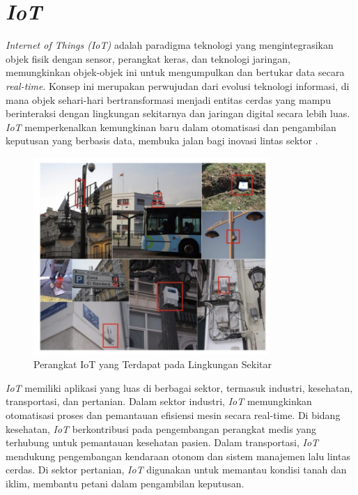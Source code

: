 \section{\textit{IoT}}

\textit{Internet of Things (IoT)} adalah paradigma teknologi yang mengintegrasikan objek fisik dengan sensor, perangkat keras, dan teknologi jaringan, memungkinkan objek-objek ini untuk mengumpulkan dan bertukar data secara \textit{real-time}. Konsep ini merupakan perwujudan dari evolusi teknologi informasi, di mana objek sehari-hari bertransformasi menjadi entitas cerdas yang mampu berinteraksi dengan lingkungan sekitarnya dan jaringan digital secara lebih luas. \textit{IoT} memperkenalkan kemungkinan baru dalam otomatisasi dan pengambilan keputusan yang berbasis data, membuka jalan bagi inovasi lintas sektor \parencite{madakam2015internet}.

\begin{figure}[ht]
  \centering
  \includegraphics[width=0.8\textwidth]{resources/chapter-2/gambar-iot.jpg}
  \caption{Perangkat IoT yang Terdapat pada Lingkungan Sekitar \parencite{sotres2017practical}}
\end{figure}

\textit{IoT} memiliki aplikasi yang luas di berbagai sektor, termasuk industri, kesehatan, transportasi, dan pertanian. Dalam sektor industri, \textit{IoT} memungkinkan otomatisasi proses dan pemantauan efisiensi mesin secara real-time. Di bidang kesehatan, \textit{IoT} berkontribusi pada pengembangan perangkat medis yang terhubung untuk pemantauan kesehatan pasien. Dalam transportasi, \textit{IoT} mendukung pengembangan kendaraan otonom dan sistem manajemen lalu lintas cerdas. Di sektor pertanian, \textit{IoT} digunakan untuk memantau kondisi tanah dan iklim, membantu petani dalam pengambilan keputusan.

